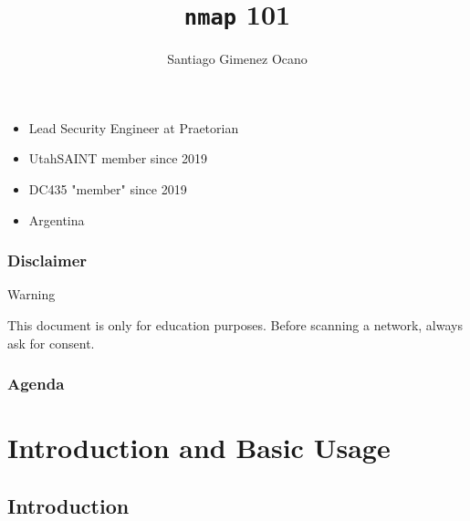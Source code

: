 \documentclass[aspectratio=169,xcolor=dvipsnames]{beamer}
\title{\texttt{nmap} 101}
\author{Santiago Gimenez Ocano}
\date{}
\begin{document}
\begin{frame}
    \titlepage
\end{frame}

\begin{frame}
    \begin{itemize}
        \item Lead Security Engineer at Praetorian
        \item UtahSAINT member since 2019
        \item DC435 "member" since 2019
        \item Argentina
    \end{itemize}
\end{frame}

\begin{frame}
    \frametitle{Disclaimer}
    
    \begin{alertblock}{Warning}
        \begin{center}
            This document is only for education purposes. Before scanning a network, always ask for consent.
        \end{center}
    \end{alertblock}

\end{frame}

\begin{frame}
    \frametitle{Agenda}
    \tableofcontents
\end{frame}

\section{Introduction and Basic Usage}

\subsection{Introduction}
\end{document}
